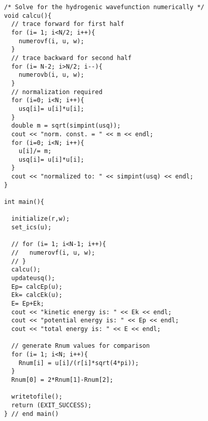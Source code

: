 \documentclass[11pt,letterpaper]{article}
\begin{document}
\begin{verbatim}
/* Solve for the hydrogenic wavefunction numerically */
void calcu(){
  // trace forward for first half
  for (i= 1; i<N/2; i++){
    numerovf(i, u, w);
  }
  // trace backward for second half
  for (i= N-2; i>N/2; i--){
    numerovb(i, u, w);
  }
  // normalization required
  for (i=0; i<N; i++){
    usq[i]= u[i]*u[i];
  }
  double m = sqrt(simpint(usq));
  cout << "norm. const. = " << m << endl;
  for (i=0; i<N; i++){
    u[i]/= m;
    usq[i]= u[i]*u[i];
  }
  cout << "normalized to: " << simpint(usq) << endl;
}

int main(){

  initialize(r,w);
  set_ics(u);

  // for (i= 1; i<N-1; i++){
  //   numerovf(i, u, w);
  // }
  calcu();
  updateusq();
  Ep= calcEp(u);
  Ek= calcEk(u);
  E= Ep+Ek;
  cout << "kinetic energy is: " << Ek << endl;
  cout << "potential energy is: " << Ep << endl;
  cout << "total energy is: " << E << endl;

  // generate Rnum values for comparison
  for (i= 1; i<N; i++){
    Rnum[i] = u[i]/(r[i]*sqrt(4*pi));
  }  
  Rnum[0] = 2*Rnum[1]-Rnum[2];

  writetofile();
  return (EXIT_SUCCESS);
} // end main()
\end{verbatim}
\vspace{1.0in}
\end{document}
